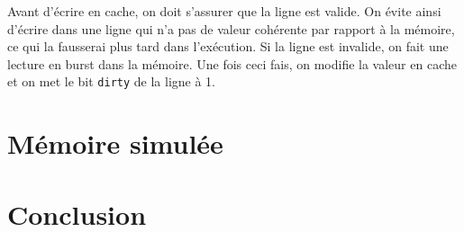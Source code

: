 \documentclass[10pt,a4paper]{article}
\begin{document}
Avant d'écrire en cache, on doit s’assurer que la ligne est valide. On évite ainsi d'écrire dans une ligne qui n'a pas de valeur cohérente par rapport à la mémoire, ce qui la fausserai plus tard dans l’exécution. Si la ligne est invalide, on fait une lecture en burst dans la mémoire. Une fois ceci fais, on modifie la valeur en cache et on met le bit \texttt{dirty} de la ligne à 1.

\section{Mémoire simulée}

\section{Conclusion}
\end{document}
